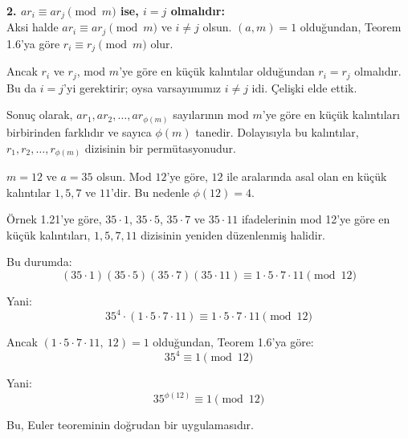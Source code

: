 \documentclass[12pt]{article}
\begin{document}
\begin{tcolorbox}[colback=green!5, colframe=green!40!black, title=\textbf{Lemma 1.6: Permütasyon Özelliği}, fonttitle=\bfseries, sharp corners]
\textbf{2. $ar_i \equiv ar_j \pmod{m}$ ise, $i = j$ olmalıdır:} \\
Aksi halde $ar_i \equiv ar_j \pmod{m}$ ve $i \ne j$ olsun. $(a, m) = 1$ olduğundan, Teorem 1.6'ya göre $r_i \equiv r_j \pmod{m}$ olur. 

Ancak $r_i$ ve $r_j$, mod $m$'ye göre en küçük kalıntılar olduğundan $r_i = r_j$ olmalıdır. Bu da $i = j$'yi gerektirir; oysa varsayımımız $i \ne j$ idi. Çelişki elde ettik.

\vspace{0.5em}

Sonuç olarak, $ar_1, ar_2, \ldots, ar_{\phi(m)}$ sayılarının mod $m$'ye göre en küçük kalıntıları birbirinden farklıdır ve sayıca $\phi(m)$ tanedir. Dolayısıyla bu kalıntılar, $r_1, r_2, \ldots, r_{\phi(m)}$ dizisinin bir permütasyonudur.
\end{tcolorbox}

\vspace{2em}

\begin{tcolorbox}[colback=gray!5, colframe=black, title=\textbf{Örnek 1.23: Euler Teoremi Uygulaması}, fonttitle=\bfseries, sharp corners]
$m = 12$ ve $a = 35$ olsun. Mod $12$'ye göre, $12$ ile aralarında asal olan en küçük kalıntılar $1, 5, 7$ ve $11$'dir. Bu nedenle $\phi(12) = 4$.

Örnek 1.21'ye göre, $35 \cdot 1$, $35 \cdot 5$, $35 \cdot 7$ ve $35 \cdot 11$ ifadelerinin mod 12'ye göre en küçük kalıntıları, $1, 5, 7, 11$ dizisinin yeniden düzenlenmiş halidir.

Bu durumda:
\[
(35 \cdot 1)(35 \cdot 5)(35 \cdot 7)(35 \cdot 11) \equiv 1 \cdot 5 \cdot 7 \cdot 11 \pmod{12}
\]

Yani:
\[
35^4 \cdot (1 \cdot 5 \cdot 7 \cdot 11) \equiv 1 \cdot 5 \cdot 7 \cdot 11 \pmod{12}
\]

Ancak $(1 \cdot 5 \cdot 7 \cdot 11,\ 12) = 1$ olduğundan, Teorem 1.6'ya göre:
\[
35^4 \equiv 1 \pmod{12}
\]

Yani:
\[
35^{\phi(12)} \equiv 1 \pmod{12}
\]

Bu, Euler teoreminin doğrudan bir uygulamasıdır.
\end{tcolorbox}

\vspace{2em}
\end{document}
